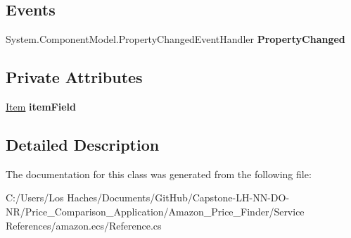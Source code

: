 \subsection*{Events}
\begin{DoxyCompactItemize}
\item 
\hypertarget{class_price___comparison_1_1amazon_1_1ecs_1_1_related_item_a1ed5724ad0fa67215dcc5ad3b1f13ee1}{System.\-Component\-Model.\-Property\-Changed\-Event\-Handler {\bfseries Property\-Changed}}\label{class_price___comparison_1_1amazon_1_1ecs_1_1_related_item_a1ed5724ad0fa67215dcc5ad3b1f13ee1}

\end{DoxyCompactItemize}
\subsection*{Private Attributes}
\begin{DoxyCompactItemize}
\item 
\hypertarget{class_price___comparison_1_1amazon_1_1ecs_1_1_related_item_af3d70524f8126ed1c3be18fec66408ff}{\hyperlink{class_price___comparison_1_1amazon_1_1ecs_1_1_item}{Item} {\bfseries item\-Field}}\label{class_price___comparison_1_1amazon_1_1ecs_1_1_related_item_af3d70524f8126ed1c3be18fec66408ff}

\end{DoxyCompactItemize}


\subsection{Detailed Description}


The documentation for this class was generated from the following file\-:\begin{DoxyCompactItemize}
\item 
C\-:/\-Users/\-Los Haches/\-Documents/\-Git\-Hub/\-Capstone-\/\-L\-H-\/\-N\-N-\/\-D\-O-\/\-N\-R/\-Price\-\_\-\-Comparison\-\_\-\-Application/\-Amazon\-\_\-\-Price\-\_\-\-Finder/\-Service References/amazon.\-ecs/Reference.\-cs\end{DoxyCompactItemize}

